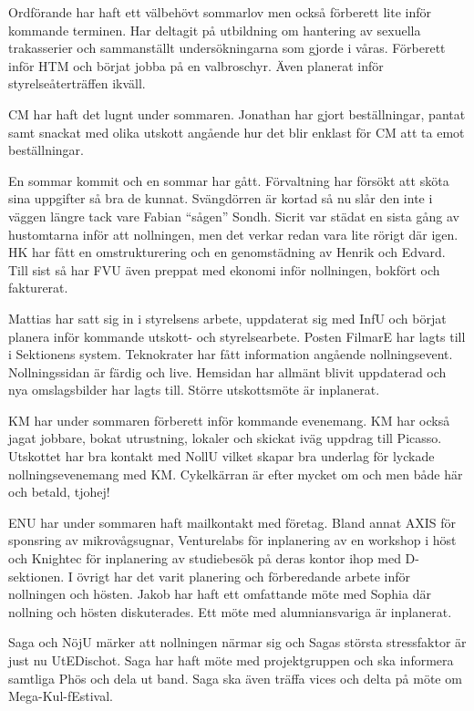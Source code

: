 \documentclass[10pt]{article}
\begin{document}
\begin{paragrafer}
\begin{paragrafer}
Ordförande har haft ett välbehövt sommarlov men också förberett lite inför kommande terminen. 
Har deltagit på utbildning om hantering av sexuella trakasserier och sammanställt undersökningarna som gjorde i våras. 
Förberett inför HTM och börjat jobba på en valbroschyr. Även planerat inför styrelseåterträffen ikväll. 

CM har haft det lugnt under sommaren. Jonathan har gjort beställningar, pantat samt 
snackat med olika utskott angående hur det blir enklast för CM att ta emot beställningar.

En sommar kommit och en sommar har gått. Förvaltning har försökt att sköta sina uppgifter så bra de kunnat. Svängdörren är kortad så nu slår den inte i väggen längre tack vare Fabian “sågen” Sondh. 
Sicrit var städat en sista gång av hustomtarna inför att nollningen, men det verkar redan vara lite rörigt där igen. HK har fått en omstrukturering och en genomstädning av Henrik och Edvard. 
Till sist så har FVU även preppat med ekonomi inför nollningen, bokfört och fakturerat. 

Mattias har satt sig in i styrelsens arbete, uppdaterat sig med InfU och börjat planera inför kommande utskott- och styrelsearbete. Posten FilmarE har lagts till i Sektionens system. Teknokrater har fått information angående nollningsevent. Nollningssidan är färdig och live. Hemsidan har allmänt blivit uppdaterad och nya omslagsbilder har lagts till. Större utskottsmöte är inplanerat. 

KM har under sommaren förberett inför kommande evenemang. KM har också jagat jobbare, bokat utrustning, lokaler och skickat iväg uppdrag till Picasso. 
Utskottet har bra kontakt med NollU vilket skapar bra underlag för lyckade nollningsevenemang med KM. 
Cykelkärran är efter mycket om och men både här och betald, tjohej! 


ENU har under sommaren haft mailkontakt med företag. Bland annat AXIS för sponsring av mikrovågsugnar, Venturelabs för inplanering av en workshop i höst och Knightec för inplanering av studiebesök på deras kontor ihop med D-sektionen. 
I övrigt har det varit planering och förberedande arbete inför nollningen och hösten. 
Jakob har haft ett omfattande möte med Sophia där nollning och hösten diskuterades. Ett möte med alumniansvariga är inplanerat. 


Saga och NöjU märker att nollningen närmar sig och Sagas största stressfaktor är just nu UtEDischot. Saga har haft möte med projektgruppen och ska informera samtliga Phös och dela ut band. 
Saga ska även träffa vices och delta på möte om Mega-Kul-fEstival. 



\end{paragrafer}
\end{paragrafer}
\end{document}
